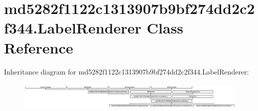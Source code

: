 \hypertarget{classmd5282f1122c1313907b9bf274dd2c2f344_1_1LabelRenderer}{}\section{md5282f1122c1313907b9bf274dd2c2f344.\+Label\+Renderer Class Reference}
\label{classmd5282f1122c1313907b9bf274dd2c2f344_1_1LabelRenderer}
Inheritance diagram for md5282f1122c1313907b9bf274dd2c2f344.\+Label\+Renderer\+:\begin{figure}[H]
\begin{center}
\leavevmode
\includegraphics[height=1.372549cm]{classmd5282f1122c1313907b9bf274dd2c2f344_1_1LabelRenderer}
\end{center}
\end{figure}
